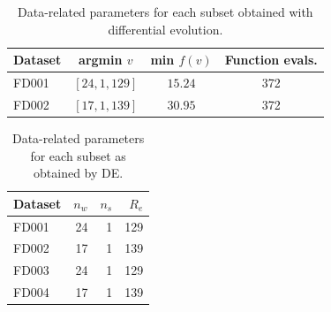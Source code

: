 \documentclass[preprint,12pt]{elsarticle}%
\begin{document}
\begin{table}
\begin{center}
\caption
{Data-related parameters for each subset obtained with differential evolution.}%
%

\begin{tabular}
[c]{l|crr}\hline
Dataset & argmin $v$ & min $f(v)$ & Function evals.\\\hline\hline
FD001 & $\left[  24,1,129\right]  $ & \multicolumn{1}{c}{$15.24$} &
\multicolumn{1}{c}{372}\\
FD002 & $\left[  17,1,139\right]  $ & \multicolumn{1}{c}{$30.95$} &
\multicolumn{1}{c}{372}\\\hline
\end{tabular}
\label{table:optimal_data_params}%

\end{center}
\end{table}%
%

\begin{table}
\begin{center}
\caption{Data-related parameters for each subset as obtained by DE.}%
%

\begin{tabular}
[c]{lrrr}\hline
Dataset & $n_{w}$ & $n_{s}$ & $R_{e}$\\\hline\hline
FD001 & 24 & 1 & 129\\
FD002 & 17 & 1 & 139\\
FD003 & 24 & 1 & 129\\
FD004 & 17 & 1 & 139\\\hline
\end{tabular}
\label{table:data_params_de}%

\end{center}
\end{table}%
%
\end{document}
